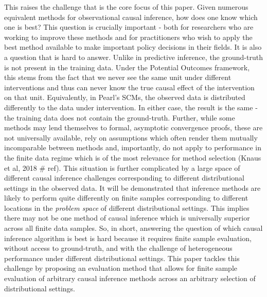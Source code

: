 \documentclass[../main.tex]{subfiles}
\begin{document}
\vspace{\baselineskip}
This raises the challenge that is the core focus of this paper. Given numerous equivalent methods for observational causal inference, how does one know which one is best? This question is crucially important - both for researchers who are working to improve these methods and for practitioners who wish to apply the best method available to make important policy decisions in their fields. It is also a question that is hard to answer. Unlike in predictive inference, the ground-truth is not present in the training data. Under the Potential Outcomes framework, this stems from the fact that we never see the same unit under different interventions and thus can never know the true causal effect of the intervention on that unit. Equivalently, in Pearl’s SCMs, the observed data is distributed differently to the data under intervention. In either case, the result is the same - the training data does not contain the ground-truth. Further, while some methods may lend themselves to formal, asymptotic convergence proofs, these are not universally available, rely on assumptions which often render them mutually incomparable between methods and, importantly, do not apply to performance in the finite data regime which is of the most relevance for method selection (Knaus et al, 2018 $\#$ ref). This situation is further complicated by a large space of different causal inference challenges corresponding to different distributional settings in the observed data. It will be demonstrated that inference methods are likely to perform quite differently on finite samples corresponding to different locations in the \textit{problem space }of different distributional settings. This implies there may not be one method of causal inference which is universally superior across all finite data samples. So, in short, answering the question of which causal inference algorithm is best is hard because it requires finite sample evaluation, without access to ground-truth, and with the challenge of heterogeneous performance under different distributional settings. This paper tackles this challenge by proposing an evaluation method that allows for finite sample evaluation of arbitrary causal inference methods across an arbitrary selection of distributional settings.\par
\end{document}
